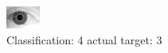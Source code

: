 \begin{figure}[h!]
\begin{center}
\includegraphics[width=0.60\columnwidth]{figures/ID2220_class_4_target_3.png}
\end{center}
\caption{ Classification: 4 actual target: 3}
\label{fig:ID2220_class_4_target_3}
\end{figure}

